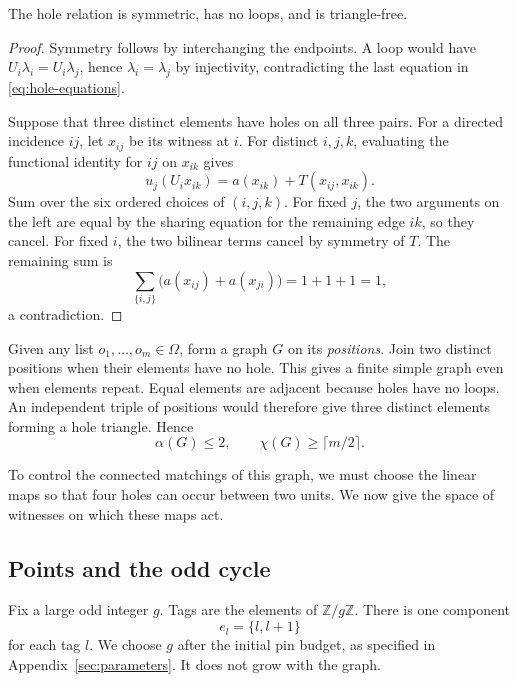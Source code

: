\begin{lemma}\label{lem:hole-triangle-free}
The hole relation is symmetric, has no loops, and is triangle-free.
\end{lemma}
\begin{proof}
Symmetry follows by interchanging the endpoints.
A loop would have \(U_i\lambda_i=U_i\lambda_j\), hence
\(\lambda_i=\lambda_j\) by injectivity, contradicting the last
equation in \eqref{eq:hole-equations}.

Suppose that three distinct elements have holes on all three pairs.
For a directed incidence \(ij\), let \(x_{ij}\) be its witness at
\(i\). For distinct \(i,j,k\), evaluating the functional identity for
\(ij\) on \(x_{ik}\) gives
\[
 u_j(U_ix_{ik})=a(x_{ik})+T(x_{ij},x_{ik}).
\]
Sum over the six ordered choices of \((i,j,k)\).
For fixed \(j\), the two arguments on the left are equal by the
sharing equation for the remaining edge \(ik\), so they cancel.
For fixed \(i\), the two bilinear terms cancel by symmetry of \(T\).
The remaining sum is
\[
 \sum_{\{i,j\}}\bigl(a(x_{ij})+a(x_{ji})\bigr)=1+1+1=1,
\]
a contradiction.
\end{proof}

Given any list \(o_1,\ldots,o_m\in\Omega\), form a graph \(G\)
on its \emph{positions}. Join two distinct positions when
their elements have no hole. This gives a finite simple graph even
when elements repeat. Equal elements are adjacent because holes have
no loops. An independent triple of positions would therefore give
three distinct elements forming a hole triangle. Hence
\begin{equation}\label{eq:sample-independence}
 \alpha(G)\le2,\qquad \chi(G)\ge\lceil m/2\rceil.
\end{equation}

To control the connected matchings of this graph, we must choose the
linear maps so that four holes can occur between two units. We now give
the space of witnesses on which these maps act.

\subsection{Points and the odd cycle}

Fix a large odd integer \(g\). Tags are the elements of \(\mathbb Z/g\mathbb Z\).
There is one component
\[
 e_l=\{l,l+1\}
\]
for each tag \(l\). We choose \(g\) after the initial pin budget, as
specified in Appendix~\ref{sec:parameters}. It does not grow with the graph.

